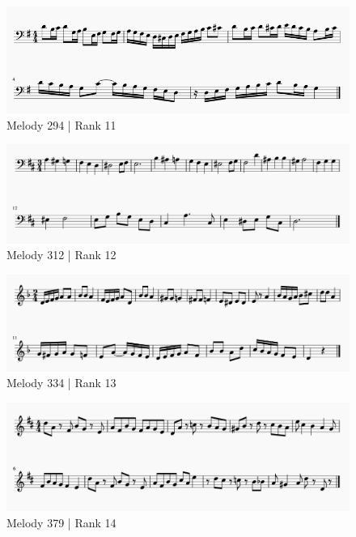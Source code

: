 \documentclass[12pt,]{book}
\begin{document}
\begin{figure}

{\centering \includegraphics[width=1\linewidth]{img/survey_melodies/Berkowitz294} 

}

\caption{Melody 294 | Rank 11}\label{fig:berk294}
\end{figure}

\begin{figure}

{\centering \includegraphics[width=1\linewidth]{img/survey_melodies/Berkowitz312} 

}

\caption{Melody 312 | Rank 12}\label{fig:berk312}
\end{figure}

\begin{figure}

{\centering \includegraphics[width=1\linewidth]{img/survey_melodies/Berkowitz334t} 

}

\caption{Melody 334 | Rank 13}\label{fig:berk334t}
\end{figure}

\begin{figure}

{\centering \includegraphics[width=1\linewidth]{img/survey_melodies/Berkowitz379} 

}

\caption{Melody 379 | Rank 14}\label{fig:berk379}
\end{figure}
\end{document}
